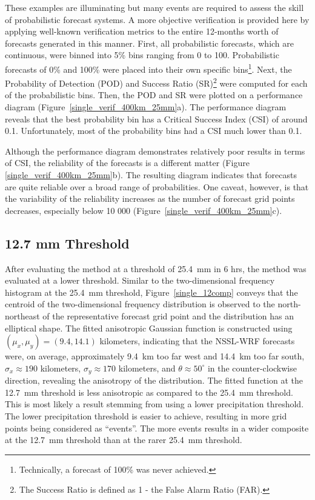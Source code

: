 These examples are illuminating but many events are required to assess the skill of probabilistic forecast systems.
A more objective verification is provided here by applying well-known verification metrics to the entire 12-months worth of forecasts generated in this manner.
First, all probabilistic forecasts, which are continuous, were binned into 5\% bins ranging from 0 to 100.
Probabilistic forecasts of 0\% and 100\% were placed into their own specific bins\footnote{Technically, a forecast of 100\% was never achieved.}.
Next, the Probability of Detection (POD) and Success Ratio (SR)\footnote{The Success Ratio is defined as 1 - the False Alarm Ratio (FAR).} were computed for each of the probabilistic bins.
Then, the POD and SR were plotted on a performance diagram \citep{Roebber2009} \mbox{(Figure \ref{single_verif_400km_25mm}a)}.
The performance diagram reveals that the best probability bin has a Critical Success Index (CSI) of around 0.1.
Unfortunately, most of the probability bins had a CSI much lower than 0.1.

Although the performance diagram demonstrates relatively poor results in terms of CSI, the reliability of the forecasts is a different matter (Figure \mbox{\ref{single_verif_400km_25mm}b)}.
The resulting diagram indicates that forecasts are quite reliable over a broad range of probabilities.
One caveat, however, is that the variability of the reliability increases as the number of forecast grid points decreases, especially below 10 000 \mbox{(Figure \ref{single_verif_400km_25mm}c)}.




\subsection{12.7 mm Threshold}
\label{dresults_12.7mm}

After evaluating the method at a threshold of \mbox{25.4 mm} in 6 hrs, the method was evaluated at a lower threshold.
Similar to the two-dimensional frequency histogram at the \mbox{25.4 mm} threshold, \mbox{Figure \ref{single_12comp}} conveys that the centroid of the two-dimensional frequency distribution is observed to the north-northeast of the representative forecast grid point and the distribution has an elliptical shape.
The fitted anisotropic Gaussian function is constructed using $(\mu_x, \mu_y) = (9.4, 14.1)$ kilometers, indicating that the NSSL-WRF forecasts were, on average, approximately \mbox{9.4 km} too far west and \mbox{14.4 km} too far south, $\sigma_x \approx 190$ kilometers, $\sigma_y \approx 170$ kilometers, and $\theta \approx 50^{\circ}$ in the counter-clockwise direction, revealing the anisotropy of the distribution.
The fitted function at the \mbox{12.7 mm} threshold is less anisotropic as compared to the \mbox{25.4 mm} threshold.
This is most likely a result stemming from using a lower precipitation threshold.
The lower precipitation threshold is easier to achieve, resulting in more grid points being considered as ``events''.
The more events results in a wider composite at the \mbox{12.7 mm} threshold than at the rarer \mbox{25.4 mm} threshold.


